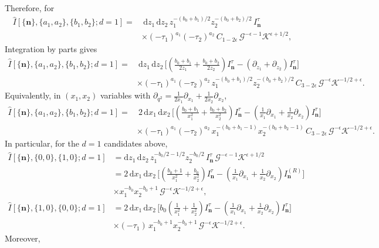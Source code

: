 \documentclass[a4paper]{article}
\newcommand{\n}{\nonumber}
\def\di{{\mathrm{d}}}
\def\ep{\epsilon}
\newcommand{\mG}{\mathcal{G}}
\newcommand{\mK}{\mathcal{K}}
\begin{document}
Therefore, for
\begin{align}
	\hat{I}[\{\bm n\},\{a_1,a_2\},\{b_1,b_2\};d=1]
	=&~\di z_1\,\di z_2\,z_1^{-(b_0+b_1)/2}z_2^{-(b_0+b_2)/2}\,I^{\tau}_{\bm n}\,\n\\
	&\times (-\tau_1)^{a_1}(-\tau_2)^{a_2}\,C_{1-2\ep}\,\mG^{-\ep-1}\mK^{\ep+1/2},
\end{align}
Integration by parts gives
\begin{align}
	\hat{I}[\{\bm n\},\{a_1,a_2\},\{b_1,b_2\};d=1]
	=&~\di z_1\,\di z_2\,\Bigg[\left(\frac{b_0+b_1}{2z_1}+\frac{b_0+b_2}{2z_2}\right)I^{\tau}_{\bm n}
	-\left(\partial_{z_1}+\partial_{z_2}\right)I^{\tau}_{\bm n}\Bigg] \n\\
	&\times (-\tau_1)^{a_1}(-\tau_2)^{a_2}\,z_1^{-(b_0+b_1)/2}z_2^{-(b_0+b_2)/2}\,
	C_{3-2\ep}\,\mG^{-\ep}\mK^{-1/2+\ep}.
\end{align}
Equivalently, in $(x_1,x_2)$ variables with $\partial_{q^2}=\frac{1}{2x_1}\partial_{x_1}+\frac{1}{2x_2}\partial_{x_2}$,
\begin{align}
	\hat{I}[\{\bm n\},\{a_1,a_2\},\{b_1,b_2\};d=1]
	=&~2\,\di x_1\,\di x_2\,\Bigg[\left(\frac{b_0+b_1}{x_1^2}+\frac{b_0+b_2}{x_2^2}\right)I^{\tau}_{\bm n}
	-\left(\frac{1}{x_1}\partial_{x_1}+\frac{1}{x_2}\partial_{x_2}\right)I^{\tau}_{\bm n}\Bigg] \n\\
	&\times (-\tau_1)^{a_1}(-\tau_2)^{a_2}\,x_1^{-(b_0+b_1-1)}x_2^{-(b_0+b_2-1)}\,
	C_{3-2\ep}\,\mG^{-\ep}\mK^{-1/2+\ep}.
\end{align}
In particular, for the $d=1$ candidates above,
\begin{align}
	\hat{I}[\{\bm n\},\{0,0\},\{1,0\};d=1]
	&= \di z_1\,\di z_2\,z_1^{-b_0/2-1/2}z_2^{-b_0/2}\,I^{\tau}_{\bm n}\,\mG^{-\ep-1}\mK^{\ep+1/2} \n\\
	&=2\,\di x_1\,\di x_2\,\Bigg[\left(\frac{b_{0}+1}{x_1^2}+\frac{b_{0}}{x_2^2}\right)I^{\tau}_{\bm n}
	-\left(\frac{1}{x_1}\partial_{x_1}+\frac{1}{x_2}\partial_{x_2}\right)I^{(R)}_{\bm n}\Bigg]\n\\
	&\times x_1^{-b_0}x_2^{-b_0+1}\,\mG^{-\ep}\mK^{-1/2+\ep}, \n\\
	\hat{I}[\{\bm n\},\{1,0\},\{0,0\};d=1]
	&=2\,\di x_1\,\di x_2\,\Bigg[b_0\left(\frac{1}{x_1^2}+\frac{1}{x_2^2}\right)I^{\tau}_{\bm n}
	-\left(\frac{1}{x_1}\partial_{x_1}+\frac{1}{x_2}\partial_{x_2}\right)I^{\tau}_{\bm n}\Bigg]\n\\
	&\times (-\tau_1)\,x_1^{-b_0+1}x_2^{-b_0+1}\,\mG^{-\ep}\mK^{-1/2+\ep}.
\end{align}
Moreover,
\end{document}
